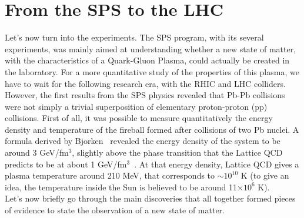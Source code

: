 \section{From the SPS to the LHC }
Let's now turn into the experiments. The SPS program, with its several experiments, was mainly aimed at understanding whether a new state of matter, with the characteristics of a Quark-Gluon Plasma, could actually be created in the laboratory.
For a more quantitative study of the properties of this
plasma, we have to wait for the following research era, with the RHIC and LHC colliders.
However, the first results from the SPS physics revealed that Pb-Pb collisions were not simply a trivial superposition of elementary proton-proton (pp) collisions.
First of all, it was possible to measure quantitatively
the energy density and temperature of the fireball formed after collisions of two Pb nuclei.
A formula derived by Bjorken~\cite{Bjorken} 
revealed the energy density of the system to be around
3 GeV/fm$^{3}$, slightly above the phase transition
that the Lattice QCD predicts to be at about 1 GeV/fm$^3$~\cite{Hands}. At that energy density,
Lattice QCD gives a plasma temperature around 210 MeV, that corresponds to $\sim 10^{10}$ K (to give an idea, the temperature inside the Sun is believed to be around 11$\times 10^{6}$ K). \\Let's now briefly go through the main discoveries that all together formed pieces of evidence to state the observation of a new state of matter.
